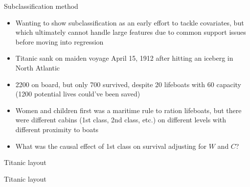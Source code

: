 \documentclass{beamer}
\begin{document}
\begin{frame}{Subclassification method}

\begin{itemize}

\item Wanting to show subclassification as an early effort to tackle covariates, but which ultimately cannot handle large features due to common support issues before moving into regression 
\item Titanic sank on maiden voyage April 15, 1912 after hitting an iceberg in North Atlantic
\item 2200 on board, but only 700 survived, despite 20 lifeboats with 60 capacity (1200 potential lives could've been saved)
\item Women and children first was a maritime rule to ration lifeboats, but there were different cabins (1st class, 2nd class, etc.) on different levels with different proximity to boats
\item What was the causal effect of 1st class on survival adjusting for $W$ and $C$?
\end{itemize}

\end{frame}


\begin{frame}{Titanic layout}
  \begin{figure}
  \end{figure}
\end{frame}

\begin{frame}{Titanic layout}
  \begin{figure}
  \end{figure}
\end{frame}
\end{document}
